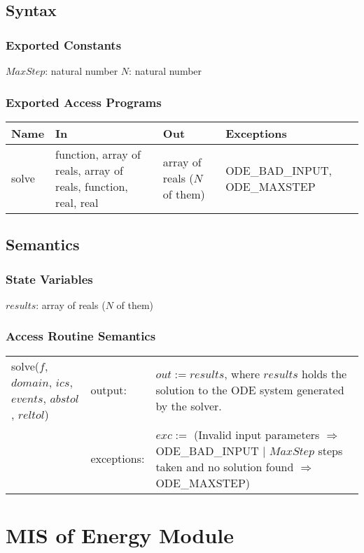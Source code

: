 \documentclass[12pt]{article}
\begin{document}
\subsection{Syntax}
\subsubsection{Exported Constants}
$MaxStep$: natural number
$N$: natural number
\subsubsection{Exported Access Programs}
\begin{center}
\begin{tabular}{p{2cm} p{4cm} p{4cm} p{4cm}}
\hline
\textbf{Name} & \textbf{In} & \textbf{Out} & \textbf{Exceptions} \\
\hline
solve & function, array of reals, array of reals, function, real, real & array of reals ($N$ of them) & ODE\_BAD\_INPUT, ODE\_MAXSTEP \\
\hline 
\end{tabular}
\end{center}
\subsection{Semantics}
\subsubsection{State Variables}
$results$: array of reals ($N$ of them)
\subsubsection{Access Routine Semantics}
\begin{center}
\begin{tabular}{l l p{5cm}}
solve($f$, $domain$, $ics$, $events$, $abstol$, $reltol$) & output: & $out := results$, where $results$ holds the solution to the ODE system generated by the solver. \\
& exceptions: & $exc :=$ (Invalid input parameters $\Rightarrow$ ODE\_BAD\_INPUT $|$ $MaxStep$ steps taken and no solution found $\Rightarrow$ ODE\_MAXSTEP)  \\
\end{tabular}
\end{center}

\section{MIS of Energy Module} \label{Energy}
\end{document}
